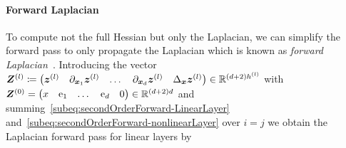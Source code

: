 \paragraph{Forward Laplacian} 
To compute not the full Hessian but only the Laplacian, we can simplify the forward pass to only propagate the Laplacian which is known as \emph{forward Laplacian}~\citep{li2023forward}. Introducing the vector ${\bm{Z}}^{(l)}\coloneqq  \begin{pmatrix}
    {\bm{z}}^{(l)}
    &
    \partial_{{\bm{x}}_1} {\bm{z}}^{(l)}
    &
    \dots
    &
    \partial_{{\bm{x}}_d} {\bm{z}}^{(l)}
    &
    \Delta_{\bm{x}}{\bm{z}}^{(l)}
\end{pmatrix}\in \mathbb R^{(d+2)h^{(l)}}$ with ${\bm{Z}}^{(0)}=  \begin{pmatrix}
    x
    &
    \mathrm e_1
    &
    \dots
    &
    \mathrm e_d
    &
    0
\end{pmatrix}\in \mathbb R^{(d+2)d}$ and summing~\eqref{subeq:secondOrderForward-LinearLayer} and~\eqref{subeq:secondOrderForward-nonlinearLayer} over $i=j$ we obtain the Laplacian forward pass for linear layers by 

